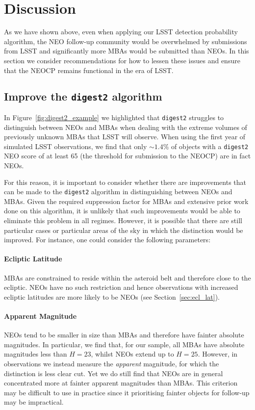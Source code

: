 \documentclass[twocolumn]{aastex631}
\newcommand{\dig}{\texttt{digest2}}
\begin{document}
\section{Discussion} \label{sec:discussion}
As we have shown above, even when applying our LSST detection probability algorithm, the NEO follow-up community would be overwhelmed by submissions from LSST and significantly more MBAs would be submitted than NEOs. In this section we consider recommendations for how to lessen these issues and ensure that the NEOCP remains functional in the era of LSST.

\subsection{Improve the \dig{} algorithm}
In Figure~\ref{fig:digest2_example} we highlighted that \dig{} struggles to distinguish between NEOs and MBAs when dealing with the extreme volumes of previously unknown MBAs that LSST will observe. When using the first year of simulated LSST observations, we find that only ${\sim}1.4\%$ of objects with a \dig{} NEO score of at least 65 (the threshold for submission to the NEOCP) are in fact NEOs.

For this reason, it is important to consider whether there are improvements that can be made to the \dig{} algorithm in distinguishing between NEOs and MBAs. Given the required suppression factor for MBAs and extensive prior work done on this algorithm, it is unlikely that such improvements would be able to eliminate this problem in all regimes. However, it is possible that there are still particular cases or particular areas of the sky in which the distinction would be improved. For instance, one could consider the following parameters:

\paragraph{Ecliptic Latitude} MBAs are constrained to reside within the asteroid belt and therefore close to the ecliptic. NEOs have no such restriction and hence observations with increased ecliptic latitudes are more likely to be NEOs (see Section~\ref{sec:ecl_lat}).

\paragraph{Apparent Magnitude} NEOs tend to be smaller in size than MBAs and therefore have fainter absolute magnitudes. In particular, we find that, for our sample, all MBAs have absolute magnitudes less than $H=23$, whilst NEOs extend up to $H=25$. However, in observations we instead measure the \textit{apparent} magnitude, for which the distinction is less clear cut. Yet we do still find that NEOs are in general concentrated more at fainter apparent magnitudes than MBAs. This criterion may be difficult to use in practice since it prioritising fainter objects for follow-up may be impractical.
\end{document}
